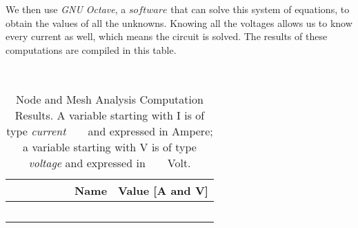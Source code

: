 We then use \textit{GNU Octave}, a $software$ that can solve this system of equations, to obtain the values of all the unknowns. Knowing all the voltages allows us to know every current as well, which means the circuit is solved.
The results of these computations are compiled in this table.

\begin{table}[h]
  \centering
  \begin{tabular}{|l|r|}
    \hline    
    {\bf Name} & {\bf Value [A and V]} \\ \hline
    
  \end{tabular}
  \caption{Node and Mesh Analysis Computation Results. A variable starting with I is of type {\em current}
    and expressed in Ampere; a variable starting with V is of type {\it voltage} and expressed in
    Volt.}
  \label{tab:op}
\end{table}